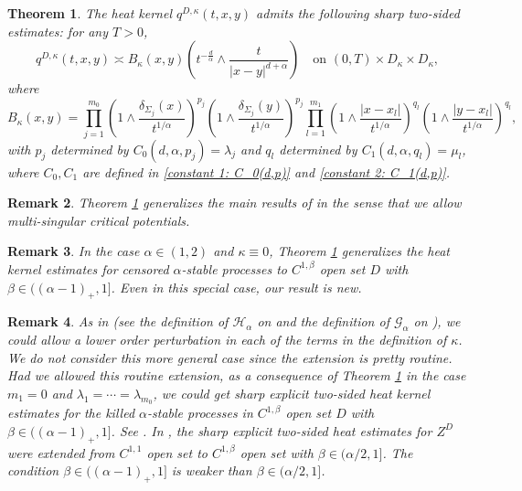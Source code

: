\documentclass[12pt,a4paper]{amsart}
\numberwithin{equation}{section}
\theoremstyle{plain}
\newcommand{\Si}{\Sigma}
\newcommand{\1}{\mathbbm{1}}
\newtheorem{theorem}{Theorem}[section]
\newtheorem{remark}[theorem]{Remark}
\begin{document}
\begin{theorem}\label{thm:main}
The heat kernel $q^{D, \kappa}(t,x,y)$ admits the following sharp two-sided estimates: for any $T>0$, 
\begin{equation}
q^{D, \kappa}(t,x,y) \asymp B_{\kappa}(x,y) \left(t^{-\frac{d}{\alpha}} \wedge \frac{t}{|x-y|^{d+\alpha}}\right) \quad \mbox{on } (0,T) \times D_\kappa \times D_\kappa,
\end{equation}
where 
$$
     B_{\kappa}(x,y) = \prod_{j=1}^{m_0} \left(1\wedge \frac{\delta_{\Si_j}(x)}{t^{1/\alpha}}\right)^{p_{j}}\left(1\wedge \frac{\delta_{\Si_j}(y)}{t^{1/\alpha}}\right)^{p_{j}} \prod_{l=1}^{m_1}  \left(1\wedge \frac{|x - x_l|}{t^{1/\alpha}}\right)^{q_{l}}\left(1\wedge \frac{|y-x_l|}{t^{1/\alpha}}\right)^{q_{l}},
$$
with $p_{j}$ determined by $C_0(d,\alpha,p_{j}) = \lambda_{j}$ and $q_l$ determined by $C_1(d,\alpha,q_{l}) = \mu_{l}$, 
where $C_0,C_1$ are defined in \eqref{constant 1: C_0(d,p)} and \eqref{constant 2: C_1(d,p)}.
\end{theorem}

\begin{remark}{\rm Theorem \ref{thm:main} generalizes the main results of \cite{CKSV20, JW20} in the sense that we allow
multi-singular critical potentials.
}
\end{remark}

\begin{remark}{\rm 
In the case $\alpha\in (1, 2)$ and $\kappa\equiv 0$, Theorem \ref{thm:main} generalizes the heat kernel estimates for
censored $\alpha$-stable processes to $C^{1, \beta}$ open set $D$ with  $\beta \in ((\alpha-1)_+,1]$. Even in this special case, our result is new. 
}
\end{remark}


\begin{remark}
{\rm 
As in \cite{CKSV20} (see the definition of $\mathcal{H}_\alpha$ on \cite[p. 234]{CKSV20} and the definition of $\mathcal{G}_\alpha$ on \cite[p. 250]{CKSV20}), we could allow a lower order perturbation in each of the terms in the definition of $\kappa$. 
We do not consider this more general case since the extension is pretty routine.
Had we allowed this routine extension, as a consequence of Theorem \ref{thm:main} in the case $m_1=0$ and $\lambda_1=\cdots=\lambda_{m_0}$, we could
get sharp explicit two-sided heat kernel estimates for the killed $\alpha$-stable processes in  $C^{1, \beta}$ open set $D$ with  $\beta \in ((\alpha-1)_+,1]$.  See \cite[Remark 3.4]{CKSV20}.  In \cite{Kim14, Kim19}, the sharp explicit two-sided heat estimates for $Z^D$ were extended from
$C^{1, 1}$ open set to $C^{1, \beta}$ open set with $\beta\in (\alpha/2, 1]$.  The condition $\beta \in ((\alpha-1)_+,1]$
is weaker than $\beta\in (\alpha/2, 1]$.
}
\end{remark}
\end{document}
